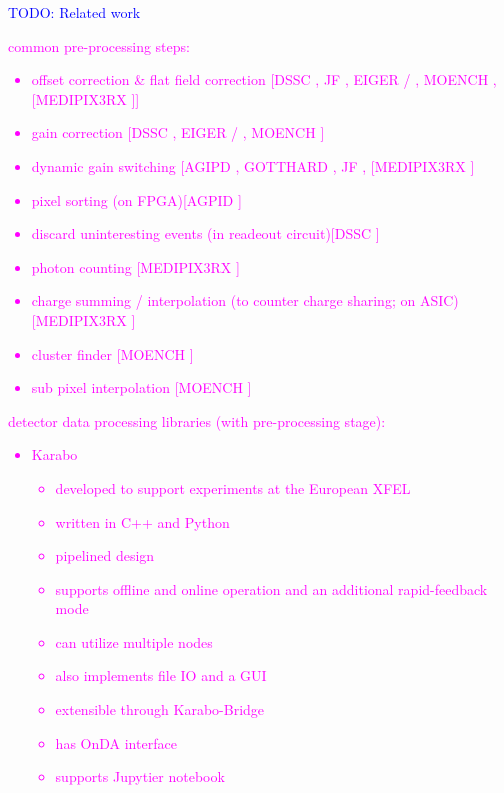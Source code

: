 \documentclass[a4paper]{article}
\begin{document}
\textcolor{blue}{TODO: Related work}\\
\textcolor{magenta}{
common pre-processing steps:
\begin{itemize}
	\item offset correction \& flat field correction [DSSC \cite{moch2014calibration}, JF \cite{JFcalibration}, EIGER\cite{tinti2018electron} / \cite{dinapoli2013eiger}, MOENCH \cite{cartier2016micrometer}, [MEDIPIX3RX \cite{ballabriga2013medipix3rx}]]
	\item gain correction [DSSC \cite{moch2014calibration}, EIGER \cite{tinti2018electron} / \cite{dinapoli2013eiger}, MOENCH \cite{cartier2016micrometer}]
	\item dynamic gain switching [AGIPD \cite{allahgholi2015agipd}, GOTTHARD \cite{mozzanica2012gotthard}, JF \cite{JFcalibration}, [MEDIPIX3RX \cite{ballabriga2013medipix3rx}]
	\item pixel sorting (on FPGA)[AGPID \cite{becker2013high}]
	\item discard uninteresting events (in readeout circuit)[DSSC \cite{erdinger2012dssc}]
	\item photon counting [MEDIPIX3RX \cite{ballabriga2013medipix3rx}]
	\item charge summing / interpolation (to counter charge sharing; on ASIC)[MEDIPIX3RX \cite{ballabriga2013medipix3rx}]
	\item cluster finder [MOENCH \cite{cartier2016micrometer}]
	\item sub pixel interpolation [MOENCH \cite{cartier2016micrometer}]
\end{itemize}
detector data processing libraries (with pre-processing stage):
\begin{itemize}
	\item Karabo \cite{fangohr2018data}
	\begin{itemize}
		\item developed to support experiments at the European XFEL
		\item written in C++ and Python
		\item pipelined design
		\item supports offline and online operation and an additional rapid-feedback mode
		\item can utilize multiple nodes
		\item also implements file IO and a GUI
		\item extensible through Karabo-Bridge
		\item has OnDA interface
		\item supports Jupytier notebook

\end{itemize}
\end{itemize}}
\end{document}
